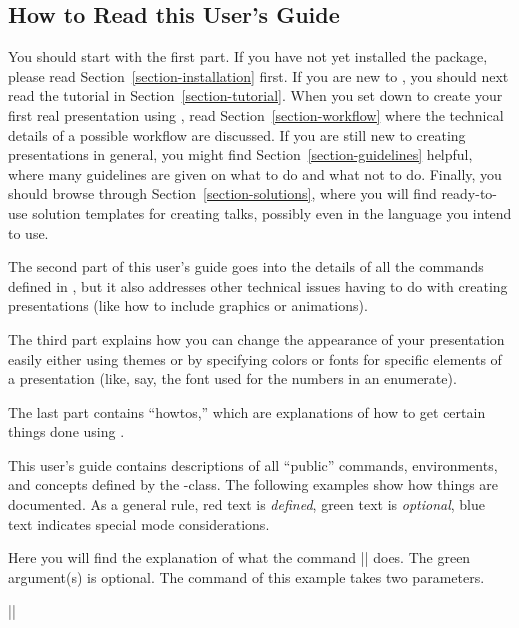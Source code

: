 \subsection{How to Read this User's Guide}

You should start with the first part. If you have not yet installed
the package, please read Section~\ref{section-installation} first. If 
you are new to \beamer, you should next read the tutorial in
Section~\ref{section-tutorial}. When you set down to create your first
real presentation using \beamer, read Section~\ref{section-workflow}
where the technical details of a possible workflow are
discussed. If you are still new to creating presentations in general, you
might find Section~\ref{section-guidelines} helpful, where many
guidelines are given on what to do and what not to do. Finally, you
should browse through Section~\ref{section-solutions}, where you will
find ready-to-use solution templates for creating talks, possibly even
in the language you intend to use.

The second part of this user's guide goes into the details of all the
commands defined in \beamer, but it also addresses  other technical
issues having to do with creating presentations (like how to include
graphics or animations).

The third part explains how you can change the appearance of your
presentation easily either using themes or by specifying colors or
fonts for specific elements of a presentation (like, say, the font
used for the numbers in an enumerate). 

The last part contains ``howtos,'' which are explanations of how to
get certain things done using \beamer.

\medskip
\noindent
This user's guide contains descriptions of all ``public''
commands, environments, and concepts defined by the \beamer-class. The
following examples show how things are documented. As a general rule,
red text is \emph{defined}, green text is \emph{optional}, blue text
indicates special mode considerations.

\begin{command}{\somebeamercommand{}}
  Here you will find the explanation of what the command
  |\somebeamercommand| does. The green argument(s) is optional. The
  command of this example takes two parameters.

  \example
  ||
\end{command}


